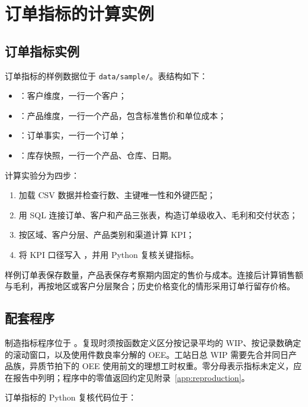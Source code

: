 \section{订单指标的计算实例}
\subsection{订单指标实例}

订单指标的样例数据位于 \texttt{data/sample/}。表结构如下：
\begin{itemize}
  \item {}：客户维度，一行一个客户；
  \item {}：产品维度，一行一个产品，包含标准售价和单位成本；
  \item {}：订单事实，一行一个订单；
  \item {}：库存快照，一行一个产品、仓库、日期。
\end{itemize}

计算实验分为四步：
\begin{enumerate}
  \item 加载 CSV 数据并检查行数、主键唯一性和外键匹配；
  \item 用 SQL 连接订单、客户和产品三张表，构造订单级收入、毛利和交付状态；
  \item 按区域、客户分层、产品类别和渠道计算 KPI；
  \item 将 KPI 口径写入 ，并用 Python 复核关键指标。
\end{enumerate}

样例订单表保存数量，产品表保存考察期内固定的售价与成本。连接后计算销售额与毛利，再按地区或客户分层聚合；历史价格变化的情形采用订单行留存价格。

\subsection{配套程序}

制造指标程序位于 。复现时须按函数定义区分按记录平均的 WIP、按记录数确定的滚动窗口，以及使用件数良率分解的 OEE。工站日总 WIP 需要先合并同日产品族，异质节拍下的 OEE 使用前文的理想工时权重。零分母表示指标未定义，应在报告中列明；程序中的零值返回约定见附录~\ref{app:reproduction}。

订单指标的 Python 复核代码位于：
\begin{center}
\end{center}

